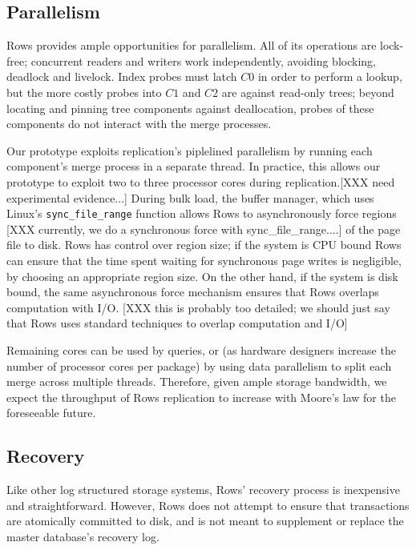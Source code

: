 \documentclass{sig-alternate-sigmod08}
\newcommand{\rows}{Rows\xspace}
\newcommand{\rowss}{Rows'\xspace}
\begin{document}
\subsection{Parallelism}

\rows provides ample opportunities for parallelism.  All of its
operations are lock-free; concurrent readers and writers work
independently, avoiding blocking, deadlock and livelock.  Index probes
must latch $C0$ in order to perform a lookup, but the more costly
probes into $C1$ and $C2$ are against read-only trees; beyond locating
and pinning tree components against deallocation, probes of these
components do not interact with the merge processes.

Our prototype exploits replication's piplelined parallelism by running
each component's merge process in a separate thread.  In practice,
this allows our prototype to exploit two to three processor cores
during replication.[XXX need experimental evidence...]  During bulk
load, the buffer manager, which uses Linux's {\tt sync\_file\_range}
function allows \rows to asynchronously force regions [XXX currently,
  we do a synchronous force with sync\_file\_range....] of the page
file to disk.  \rows has control over region size; if the system is
CPU bound \rows can ensure that the time spent waiting for synchronous
page writes is negligible, by choosing an appropriate region size.  On
the other hand, if the system is disk bound, the same asynchronous
force mechanism ensures that \rows overlaps computation with I/O. [XXX
  this is probably too detailed; we should just say that \rows uses
  standard techniques to overlap computation and I/O]

Remaining cores can be used by queries, or (as hardware designers
increase the number of processor cores per package) by using data
parallelism to split each merge across multiple threads.  Therefore,
given ample storage bandwidth, we expect the throughput of \rows
replication to increase with Moore's law for the foreseeable future.

\subsection{Recovery}

Like other log structured storage systems, \rowss recovery process is
inexpensive and straightforward.  However, \rows does not attempt to
ensure that transactions are atomically committed to disk, and is not
meant to supplement or replace the master database's recovery log.
\end{document}
